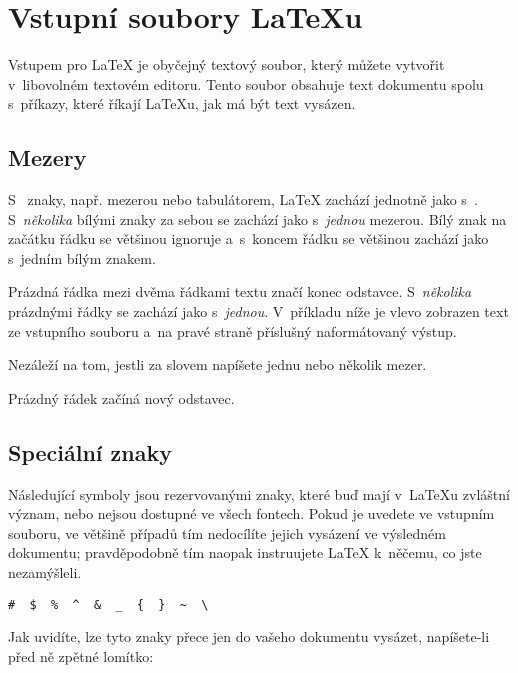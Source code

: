\section{Vstupní soubory \LaTeX u}

Vstupem pro \LaTeX{} je obyčejný textový soubor,
který můžete vytvořit v~libovolném textovém editoru. Tento soubor
obsahuje text dokumentu spolu s~příkazy, které říkají \LaTeX u,
jak má být text vysázen.

\subsection{Mezery}

S~ znaky, např. mezerou nebo tabulátorem, \LaTeX{} zachází
jednotně jako s~. S~\emph{několika}
bílými znaky za sebou
se zachází jako s~\emph{jednou} mezerou. Bílý znak na začátku řádku
se většinou ignoruje a~s~koncem řádku se většinou zachází jako s~jedním bílým
znakem. 

Prázdná řádka mezi dvěma řádkami textu značí konec odstavce.
S~\emph{několika} prázdnými řádky se zachází jako s~\emph{jednou}.
V~příkladu níže je vlevo zobrazen text ze vstupního souboru
a~na pravé straně příslušný naformátovaný výstup.

\begin{example}
Nezáleží na tom, jestli
za slovem napíšete jednu
nebo několik     mezer.

Prázdný řádek začíná nový
odstavec.
\end{example}
 
\subsection{Speciální znaky}

Následující symboly jsou rezervovanými znaky, které buď mají
v~\LaTeX u zvláštní význam, nebo nejsou dostupné ve všech fontech.
Pokud je uvedete ve vstupním souboru, ve většině případů
tím nedocílíte jejich vysázení ve výsledném dokumentu; pravděpodobně
tím naopak instruujete \LaTeX{} k~něčemu, co jste nezamýšleli.

\begin{code}
\verb.#  $  %  ^  &  _  {  }  ~  \ . %
\end{code}

Jak uvidíte, lze tyto znaky přece jen do vašeho dokumentu vysázet,
napíšete-li před ně zpětné lomítko:

